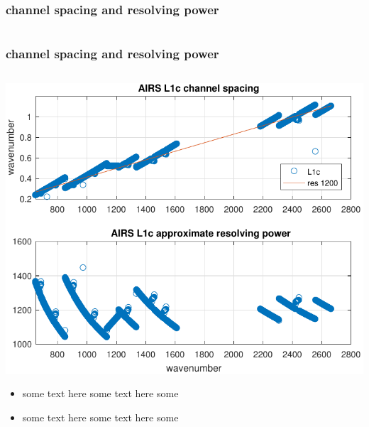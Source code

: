 \begin{frame}
\frametitle{channel spacing and resolving power}
\begin{columns}[t]
\begin{column}{0.5\textwidth}

\end{column}
\begin{column}{0.5\textwidth}  

\end{column}
\end{columns}
\end{frame}
\begin{frame} %
\frametitle{channel spacing and resolving power}
\begin{columns}[t]
\begin{column}{0.5\textwidth}
  \includegraphics[width=\textwidth]{figures/airs_L1c_res.pdf}
  \begin{itemize}
     \item some text here some text here some 
     \item some text here some text here some 
  \end{itemize}


\end{column}
\end{columns}
\end{frame}
